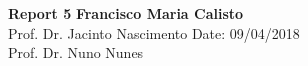 \documentclass[a4paper, 11pt]{article}
\begin{document}
\noindent
\large\textbf{Report 5} \hfill \textbf{Francisco Maria Calisto} \\
\normalsize
Prof. Dr. Jacinto Nascimento \hfill Date: 09/04/2018 \\
Prof. Dr. Nuno Nunes





\clearpage



\end{document}
